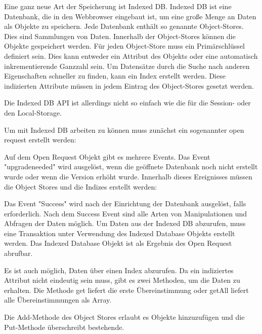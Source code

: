 
Eine ganz neue Art der Speicherung ist Indexed DB. Indexed DB ist eine Datenbank, die in den Webbrowser eingebaut ist, um eine große Menge an Daten als Objekte zu speichern. Jede Datenbank enthält so genannte Object-Stores. Dies sind Sammlungen von Daten. Innerhalb der Object-Stores können die Objekte gespeichert werden. Für jeden Object-Store muss ein Primärschlüssel definiert sein. Dies kann entweder ein Attribut des Objekts oder eine automatisch inkrementierende Ganzzahl sein. Um Datensätze durch die Suche nach anderen Eigenschaften schneller zu finden, kann ein Index erstellt werden. Diese indizierten Attribute müssen in jedem Eintrag des Object-Stores gesetzt werden.

Die Indexed DB API ist allerdings nicht so einfach wie die für die Session- oder den Local-Storage. 

Um mit Indexed DB arbeiten zu können muss zunächst ein sogenannter open request erstellt werden:


Auf dem Open Request Objekt gibt es mehrere Events. Das Event "upgradeneeded" wird ausgelöst, wenn die geöffnete Datenbank noch nicht erstellt wurde oder wenn die Version erhöht wurde. Innerhalb dieses Ereignisses müssen die Object Stores und die Indizes erstellt werden: 


Das Event "Success" wird nach der Einrichtung der Datenbank ausgelöst, falls erforderlich. Nach dem Success Event sind alle Arten von Manipulationen und Abfragen der Daten möglich. Um Daten aus der Indexed DB abzurufen, muss eine Transaktion unter Verwendung des Indexed Database Objekts erstellt werden. Das Indexed Database Objekt ist als Ergebnis des Open Request abrufbar.


Es ist auch möglich, Daten über einen Index abzurufen. Da ein indiziertes 
Attribut nicht eindeutig sein muss, gibt es zwei Methoden, um die Daten zu erhalten. Die Methode get liefert die erste Übereinstimmung oder getAll liefert alle Übereinstimmungen als Array.


Die Add-Methode des Object Stores erlaubt es Objekte hinzuzufügen und die Put-Methode überschreibt bestehende.
\cite{MDNIndexedDB}
\cite{MDNUsingIndexedDB}
